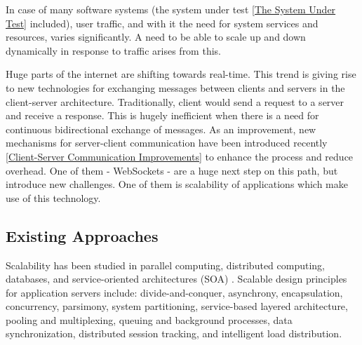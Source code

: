 \documentclass{uvamscse}
\begin{document}
In case of many software systems (the system under test \ref{The System Under Test} included), user traffic, and with it the need for system services and resources, varies significantly. A need to be able to scale up and down dynamically in response to traffic arises from this.

Huge parts of the internet are shifting towards real-time. This trend is giving rise to new technologies for exchanging messages between clients and servers in the client-server architecture. Traditionally, client would send a request to a server and receive a response. This is hugely inefficient when there is a need for continuous bidirectional exchange of messages. As an improvement, new mechanisms for server-client communication have been introduced recently \ref{Client-Server Communication Improvements} to enhance the process and reduce overhead. One of them - WebSockets - are a huge next step on this path, but introduce new challenges. One of them is scalability of applications which make use of this technology.

\subsection{Existing Approaches}
Scalability has been studied in parallel computing, distributed computing, databases, and service-oriented architectures (SOA) \cite{WeiTek}. Scalable design principles for application servers include: divide-and-conquer, asynchrony, encapsulation, concurrency, parsimony, system partitioning, service-based layered architecture, pooling and multiplexing, queuing and background processes, data synchronization, distributed session tracking, and intelligent load distribution.
\end{document}

